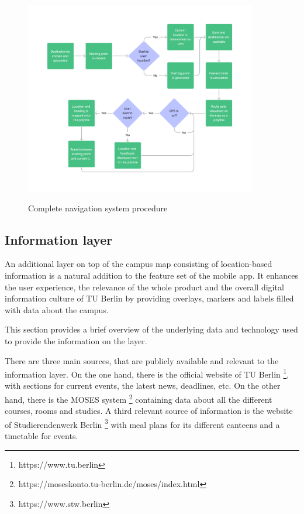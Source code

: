 \begin{figure}[!ht]
	\centering
	\includegraphics[width=0.9\textwidth]{images/navigation_process.png}\\
	\caption{Complete navigation system procedure}
    \label{fig:navigation_system}
\end{figure}

\subsection{Information layer}
An additional layer on top of the campus map consisting of location-based information is a natural addition to the feature set of the mobile app. It enhances the user experience, the relevance of the whole product and the overall digital information culture of TU Berlin by providing overlays, markers and labels filled with data about the campus.

This section provides a brief overview of the underlying data and technology used to provide the information on the layer.

There are three main sources, that are publicly available and relevant to the information layer. On the one hand, there is the official website of TU Berlin \footnote{https://www.tu.berlin}, with sections for current events, the latest news, deadlines, etc. On the other hand, there is the MOSES system \footnote{https://moseskonto.tu-berlin.de/moses/index.html} containing data about all the different courses, rooms and studies. A third relevant source of information is the website of Studierendenwerk Berlin \footnote{https://www.stw.berlin} with meal plans for its different canteens and a timetable for events.

